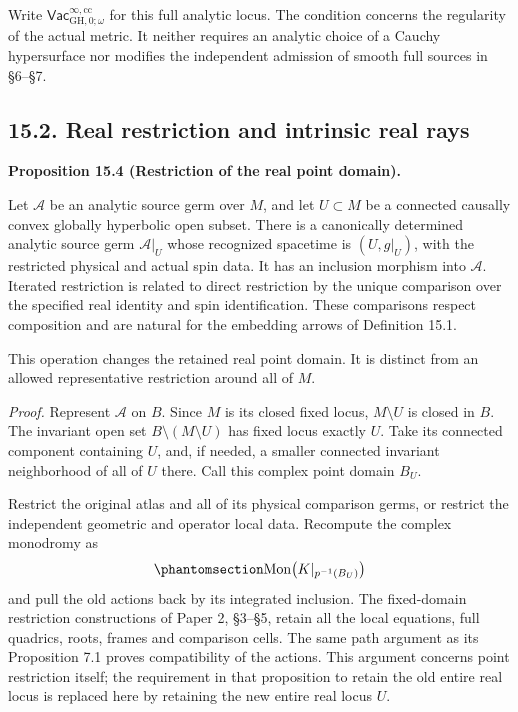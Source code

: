 \documentclass[
  english,
  11pt,
  reqno]{amsart}
\makeatletter
\newcommand{\paperdisplaynext}{%
  \let\paper@savedstartsection\@startsection
  \def\@startsection##1##2##3##4##5##6{%
    \let\@startsection\paper@savedstartsection
    \@tempskipa ##5\relax
    \ifdim\@tempskipa<\z@
      \def\paper@afterskip{.35\baselineskip}%
    \else
      \def\paper@afterskip{##5}%
    \fi
    \@startsection{##1}{##2}{##3}{##4}{\paper@afterskip}{##6}}}
\newcommand{\paperdisplaysection}{\paperdisplaynext\subsection}
\newcommand{\pandocstatementheading}[1]{%
  \par\if@nobreak\else
    \addpenalty{\@beginparpenalty}%
    \addvspace{.5\baselineskip plus .2\baselineskip minus .2\baselineskip}%
  \fi
  {\normalfont\bfseries #1\par}%
  \nobreak\@afterindenttrue\@afterheading
}
\makeatother
\begin{document}
Write \(\mathsf{Vac}^{\infty,\mathrm{cc}}_{\mathrm{GH},0;\omega}\) for
this full analytic locus. The condition concerns the regularity of the
actual metric. It neither requires an analytic choice of a Cauchy
hypersurface nor modifies the independent admission of smooth full
sources in §6--§7.

\protect{}\label{sec:analytic-source-real-restriction}
\paperdisplaysection{15.2. Real restriction and intrinsic real
rays}\label{real-restriction-and-intrinsic-real-rays}
\pandocstatementheading{\protect{}\label{prop:analytic-source-real-point-restriction}Proposition 15.4 (Restriction of the real point domain).}

Let \(\mathcal A\) be an analytic source germ over \(M\), and let
\(U\subset M\) be a connected causally convex globally hyperbolic open
subset. There is a canonically determined analytic source germ
\(\mathcal A|_U\) whose recognized spacetime is \((U,g|_U)\), with the
restricted physical and actual spin data. It has an inclusion morphism
into \(\mathcal A\). Iterated restriction is related to direct
restriction by the unique comparison over the specified real identity
and spin identification. These comparisons respect composition and are
natural for the embedding arrows of Definition 15.1.

This operation changes the retained real point domain. It is distinct
from an allowed representative restriction around all of \(M\).

\emph{Proof.} Represent \(\mathcal A\) on \(B\). Since \(M\) is its
closed fixed locus, \(M\setminus U\) is closed in \(B\). The invariant
open set \(B\setminus(M\setminus U)\) has fixed locus exactly \(U\).
Take its connected component containing \(U\), and, if needed, a smaller
connected invariant neighborhood of all of \(U\) there. Call this
complex point domain \(B_U\).

Restrict the original atlas and all of its physical comparison germs, or
restrict the independent geometric and operator local data. Recompute
the complex monodromy as
\begin{equation}\protect\phantomsection\label{eq:analytic-source-real-domain-monodromy}{
\operatorname{Mon}\bigl(K|_{p^{-1}(B_U)}\bigr)
}\end{equation} and pull the old actions back by its integrated
inclusion. The fixed-domain restriction constructions of Paper 2,
§3--§5, retain all the local equations, full quadrics, roots, frames and
comparison cells. The same path argument as its Proposition 7.1 proves
compatibility of the actions. This argument concerns point restriction
itself; the requirement in that proposition to retain the old entire
real locus is replaced here by retaining the new entire real locus
\(U\).
\end{document}
